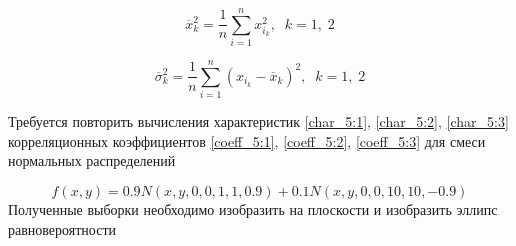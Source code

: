 {    \begin{equation}
        \label{char_5:2}
        \overline{x}^2_k = \frac{1}{n}\sum_{i=1}^{n}{x^2_{i_k}}, \;\; k = 1, \; 2
    \end{equation}
    
    \begin{equation}
        \label{char_5:3}
        \overline{\sigma}^2_k = \frac{1}{n}\sum_{i=1}^{n}{(x_{i_k}-\overline{x}_k)^2}, \;\; k = 1, \; 2
    \end{equation}
    
    \indent Требуется повторить вычисления характеристик \eqref{char_5:1}, \eqref{char_5:2}, \eqref{char_5:3}  корреляционных коэффициентов \eqref{coeff_5:1}, \eqref{coeff_5:2}, \eqref{coeff_5:3} для смеси нормальных распределений
    
    \begin{equation}
        \label{dist_5:2}
        f(x, y) = 0.9 N(x, y, 0, 0, 1, 1, 0.9) + 0.1 N(x, y, 0, 0, 10, 10, -0.9)
    \end{equation}
    \indent Полученные выборки необходимо изобразить на плоскости и изобразить эллипс равновероятности }